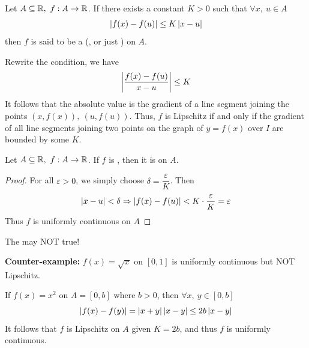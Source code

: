 \documentclass[a4paper,12pt]{article}
\begin{document}
\begin{definition}
    Let \(A\subseteq\R,\ f:A\rightarrow\R\). If there exists a constant \(K>0\) such that \(\forall x,\ u\in A\)
    \[\left\lvert f(x)-f(u)\right\rvert\le K\left\lvert x-u\right\rvert\]
    then \(f\) is said to be a  (, or just ) on \(A\).\\
\end{definition}

\begin{remark}
    Rewrite the condition, we have \[\left\lvert \frac{f(x)-f(u)}{x-u}\right\rvert\le K\]
    It follows that the absolute value is the gradient of a line segment joining the points \((x,f(x)),\ (u,f(u))\). 
    Thus, \(f\) is Lipschitz if and only if the gradient of all line segments joining two points on the graph of \(y=f(x)\) over \(I\) are bounded by some \(K\).\\
\end{remark}

\begin{theorem}
    Let \(A\subseteq\R,\ f:A\rightarrow\R\). If \(f\) is , then it is  on \(A\).
    \begin{proof}
        For all \(\varepsilon>0\), we simply choose \(\delta=\dfrac{\varepsilon }{K}\). Then 
        \[\left\lvert x-u\right\rvert<\delta\Rightarrow\left\lvert f(x)-f(u)\right\rvert<K\cdot\frac{\varepsilon }{K }=\varepsilon\]
        Thus \(f\) is uniformly continuous on \(A\)
    \end{proof}
\end{theorem}

\begin{remark}
    The  may NOT true!

    \textbf{Counter-example:} \(f(x)=\sqrt{x}\) on \([0,1]\) is uniformly continuous but NOT Lipschitz.\\
\end{remark}

\begin{example}
    If \(f(x)=x^2\) on \(A=[0,b]\) where \(b>0\), then \(\forall x,\ y\in [0,b]\)
    \[\left\lvert f(x)-f(y)\right\rvert=\left\lvert x+y\right\rvert\left\lvert x-y\right\rvert\le 2b\left\lvert x-y\right\rvert\]
    It follows that \(f\) is Lipschitz on \(A\) given \(K=2b\), and thus \(f\) is uniformly continuous.\\
\end{example}
\end{document}
